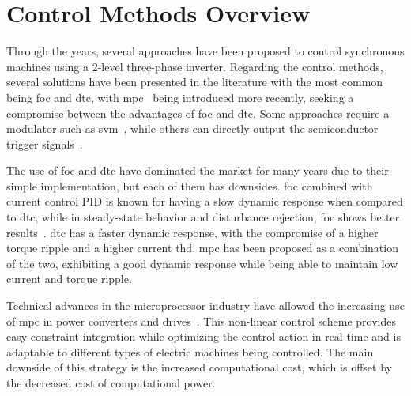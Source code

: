 \section{Control Methods Overview}\label{section:control_methods_overview}

Through the years, several approaches have been proposed to control synchronous machines using a 2-level three-phase inverter. Regarding the control methods, several solutions have been presented in the literature with the most common being \gls{foc} and \gls{dtc}, with \gls{mpc}~\cite{Bianchi:control_review} being introduced more recently, seeking a compromise between the advantages of \gls{foc} and \gls{dtc}. Some approaches require a modulator such as \gls{svm}~\cite{Neacsu:SVM_intro:2001:IECON}, while others can directly output the semiconductor trigger signals~\cite{Vazquez:MPC_in_power_systems_review:2017:IEEE}.

The use of \gls{foc} and \gls{dtc} have dominated the market for many years due to their simple implementation, but each of them has downsides\@. \gls{foc} combined with current control PID is known for having a slow dynamic response when compared to \gls{dtc}, while in steady-state behavior and disturbance rejection, \gls{foc} shows better results~\cite{Merzoug:FOCvsDTC:2008,Korkmaz:FOCvsDTC:2013,Souad:FOCvsDTC:2008}. \gls{dtc} has a faster dynamic response, with the compromise of a higher torque ripple and a higher current \gls{thd}. \gls{mpc} has been proposed as a combination of the two, exhibiting a good dynamic response while being able to maintain low current and torque ripple. 

Technical advances in the microprocessor industry have allowed the increasing use of \gls{mpc} in power converters and drives~\cite{Vazquez:MPC_in_power_systems_review:2017:IEEE}. This non-linear control scheme provides easy constraint integration while optimizing the control action in real time and is adaptable to different types of electric machines being controlled. The main downside of this strategy is the increased computational cost, which is offset by the decreased cost of computational power.

